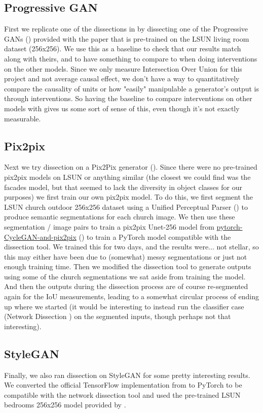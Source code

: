 \documentclass{article}
\begin{document}
\subsection{Progressive GAN}
First we replicate one of the dissections in \cite{gandissect} by dissecting one of the Progressive GANs (\cite{progan}) provided with the paper that is pre-trained on the LSUN living room dataset (256x256). We use this as a baseline to check that our results match along with theirs, and to have something to compare to when doing interventions on the other models. Since we only measure Intersection Over Union for this project and not average causal effect, we don't have a way to quantitatively compare the causality of units or how "easily" manipulable a generator's output is through interventions. So having the baseline to compare interventions on other models with gives us some sort of sense of this, even though it's not exactly measurable. 

\subsection{Pix2pix}
Next we try dissection on a Pix2Pix generator (\cite{pix2pix}). Since there were no pre-trained pix2pix models on LSUN or anything similar (the closest we could find was the facades model, but that seemed to lack the diversity in object classes for our purposes) we first train our own pix2pix model. To do this, we first segment the LSUN church outdoor 256x256 dataset using a Unified Perceptual Parser (\cite{segmenter}) to produce semantic segmentations for each church image. We then use these segmentation / image pairs to train a pix2pix Unet-256 model from \href{https://github.com/junyanz/pytorch-CycleGAN-and-pix2pix}{pytorch-CycleGAN-and-pix2pix} (\cite{pix2pix}) to train a PyTorch model compatible with the dissection tool. We trained this for two days, and the results were... not stellar, so this may either have been due to (somewhat) messy segmentations or just not enough training time. Then we modified the dissection tool to generate outputs using some of the church segmentations we sat aside from training the model. And then the outputs during the dissection process are of course re-segmented again for the IoU measurements, leading to a somewhat circular process of ending up where we started (it would be interesting to instead run the classifier case (Network Dissection \cite{netdissect}) on the segmented inputs, though perhaps not that interesting).

\subsection{StyleGAN}
Finally, we also ran dissection on StyleGAN for some pretty interesting results. We converted the official TensorFlow implementation from \cite{stylegan} to PyTorch to be compatible with the network dissection tool and used the pre-trained LSUN bedrooms 256x256 model provided by \cite{stylegan}.
\end{document}
